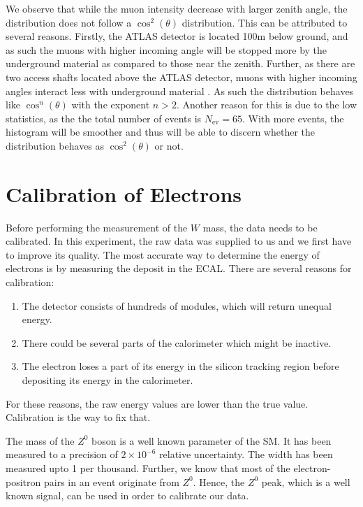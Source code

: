 \documentclass[a4paper]{report}
\numberwithin{equation}{section}
\begin{document}
We observe that while the muon intensity decrease with larger zenith angle, 
the distribution does not follow a $\cos^2 (\theta)$ distribution. This can be attributed to several reasons. Firstly, the ATLAS detector 
is located 100m below ground, and as such the muons with higher incoming angle will be stopped more by the underground material 
as compared to those near the zenith. Further, as there are two access shafts located above the ATLAS detector, muons with higher 
incoming angles interact less with underground material  \cite{Aad2011}. As such the distribution behaves like $\cos^n (\theta)$ with 
the exponent $n > 2$. Another reason for this is due to the low statistics, as the the total number of events is $N_{\mathrm{ev}} = 65$. 
With more events, the histogram will be smoother and thus will be able to discern whether the distribution behaves as $\cos^2(\theta)$
or not.\par 


\chapter{Calibration of Electrons} \label{chap:elec_calib}

Before performing the measurement of the $W$ mass, the data needs to be calibrated. In this experiment, the raw data was supplied to us and we first have to improve its quality. The most accurate way to determine the energy of electrons is by measuring the deposit in the ECAL. There are several reasons for calibration:

\begin{enumerate}
	\item The detector consists of hundreds of modules, which will return unequal energy. 
	\item There could be several parts of the calorimeter which might be inactive. 
	\item The electron loses a part of its energy in the silicon tracking region before depositing its energy in the calorimeter. 
\end{enumerate}
For these reasons, the raw energy values are lower than the true value. Calibration is the way to fix that. 

The mass of the $Z^0$ boson is a well known parameter of the SM. It has been measured to a precision of $2 \times 10^{-6}$ relative uncertainty. The width has been measured upto 1 per thousand. Further, we know that most of the electron-positron pairs in an event originate from $Z^0$. Hence, the $Z^0$ peak, which is a well known signal, can be used in order to calibrate our data. 
\end{document}
